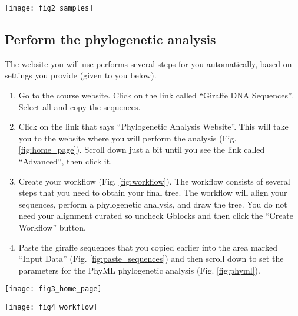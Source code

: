 \documentclass[11pt, addpoints]{exam}
\begin{document}
\begin{center}
	\texttt{[image: fig2\_samples]}
\end{center}

\subsection*{Perform the phylogenetic analysis}

The website you will use performs several steps for you automatically,
based on settings you provide (given to you below).

\begin{enumerate}
\item
  Go to the course website. Click on the link called ``Giraffe DNA
  Sequences''. Select all and copy the sequences.
\item
  Click on the link that says ``Phylogenetic Analysis Website''. This
  will take you to the website where you will perform the analysis (Fig.
  \ref{fig:home_page}). Scroll down just a bit until you see the link called ``Advanced'',
  then click it.
\item Create your workflow (Fig. \ref{fig:workflow}). The workflow consists of several steps
  that you need to obtain your final tree. The workflow will align your
  sequences,  perform a phylogenetic analysis, and draw the
  tree. You do not need your alignment curated so uncheck Gblocks and
  then click the ``Create Workflow'' button.
\item
  Paste the giraffe sequences that you copied earlier into the area
  marked ``Input Data'' (Fig. \ref{fig:paste_sequences}) and then scroll down to set the
  parameters for the PhyML phylogenetic analysis (Fig. \ref{fig:phyml}).
\end{enumerate}

\begin{center}
	\texttt{[image: fig3\_home\_page]}
\end{center}

\vfill

\begin{center}
	\texttt{[image: fig4\_workflow]}
\end{center}
\end{document}
